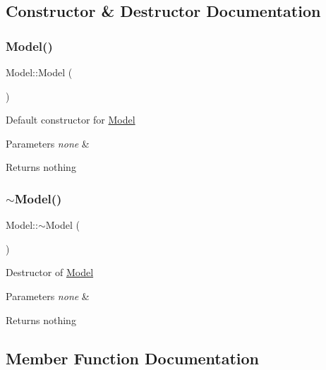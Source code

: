 \subsection{Constructor \& Destructor Documentation}
\mbox{\label{class_model_ae3b375de5f6df4faf74a95d64748e048}} 
\subsubsection{\texorpdfstring{Model()}{Model()}}
{\footnotesize\ttfamily Model\+::\+Model (\begin{DoxyParamCaption}{ }\end{DoxyParamCaption})}

Default constructor for \hyperlink{class_model}{Model}


\begin{DoxyParams}{Parameters}
{\em none} & \\
\hline
\end{DoxyParams}
\begin{DoxyReturn}{Returns}
nothing 
\end{DoxyReturn}
\mbox{\label{class_model_ad6ebd2062a0b823db841a0b88baac4c0}} 
\subsubsection{\texorpdfstring{$\sim$\+Model()}{~Model()}}
{\footnotesize\ttfamily Model\+::$\sim$\+Model (\begin{DoxyParamCaption}{ }\end{DoxyParamCaption})}

Destructor of \hyperlink{class_model}{Model}


\begin{DoxyParams}{Parameters}
{\em none} & \\
\hline
\end{DoxyParams}
\begin{DoxyReturn}{Returns}
nothing 
\end{DoxyReturn}


\subsection{Member Function Documentation}
\mbox{\label{class_model_ab6f784e4ff8cdf3ee5e010ef4dd8d597}} 
